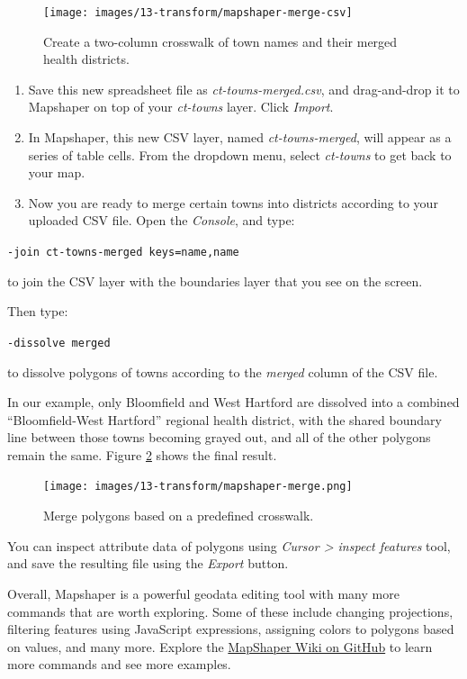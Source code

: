 \documentclass[
  english,
]{book}
\begin{document}
\begin{figure}
\texttt{[image: images/13-transform/mapshaper-merge-csv]} \caption{Create a two-column crosswalk of town names and their merged health districts.}\label{fig:mapshaper-merge-csv}
\end{figure}

\begin{enumerate}
\def\labelenumi{\arabic{enumi}.}
\setcounter{enumi}{5}
\item
  Save this new spreadsheet file as \emph{ct-towns-merged.csv}, and drag-and-drop it to Mapshaper on top of your \emph{ct-towns} layer. Click \emph{Import}.
\item
  In Mapshaper, this new CSV layer, named \emph{ct-towns-merged}, will appear as a series of table cells. From the dropdown menu,
  select \emph{ct-towns} to get back to your map.
\item
  Now you are ready to merge certain towns into districts according to your uploaded CSV file. Open the \emph{Console}, and type:
\end{enumerate}

\texttt{-join\ ct-towns-merged\ keys=name,name}

to join the CSV layer with the boundaries layer that you see on the screen.

Then type:

\texttt{-dissolve\ merged}

to dissolve polygons of towns according to the \emph{merged} column of the CSV file.

In our example, only Bloomfield and West Hartford are dissolved into a combined
``Bloomfield-West Hartford'' regional health district, with the shared boundary line between those towns becoming grayed out,
and all of the other polygons remain the same. Figure \ref{fig:mapshaper-merge} shows the final result.



\begin{figure}
\centering
\texttt{[image: images/13-transform/mapshaper-merge.png]}
\caption{\label{fig:mapshaper-merge}Merge polygons based on a predefined crosswalk.}
\end{figure}

You can inspect attribute data of polygons using \emph{Cursor \textgreater{} inspect features} tool, and save the resulting file
using the \emph{Export} button.

Overall, Mapshaper is a powerful geodata editing tool with many more commands that are worth exploring. Some of these include changing projections, filtering features using JavaScript expressions, assigning colors to polygons based on values, and many more. Explore the \href{https://github.com/mbloch/mapshaper/wiki/Command-Reference}{MapShaper Wiki on GitHub} to learn more commands and see more examples.
\end{document}
